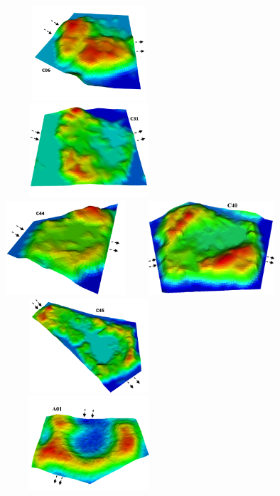 \begin{figure}[!h]
\centering
\vskip -2cm
\includegraphics[width=6.2cm, height=3.5cm]{./figures/polygons-finescale/3Dpolygon06-3B.png}
\includegraphics[width=6.2cm, height=3.5cm]{./figures/polygons-finescale/3Dpolygon31-3B.png}\\
\includegraphics[width=6.cm, height=3.5cm]{./figures/polygons-finescale/3Dpolygon44-3B.png}
\includegraphics[width=6.2cm, height=3.5cm]{./figures/polygons-finescale/3Dpolygon40-1.png} \\
 \includegraphics[width=6.2cm, height=3.5cm]{./figures/polygons-finescale/3Dpolygon45-3B.png}
\includegraphics[width=6.2cm, height=3.5cm]{./figures/polygons-finescale/3DpolygonA01-3E.png}\\

\end{figure}
